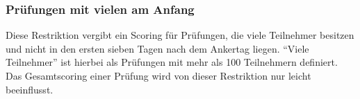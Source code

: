 \subsubsection{Prüfungen mit vielen am Anfang}\label{subsubsec:pruefungenMitVielenAmAnfang}
Diese Restriktion vergibt ein Scoring für Prüfungen, die viele Teilnehmer besitzen und nicht
in den ersten sieben Tagen nach dem Ankertag liegen.
\enquote{Viele Teilnehmer} ist hierbei als Prüfungen mit mehr als 100 Teilnehmern definiert.
Das Gesamtscoring einer Prüfung wird von dieser Restriktion nur leicht beeinflusst.
